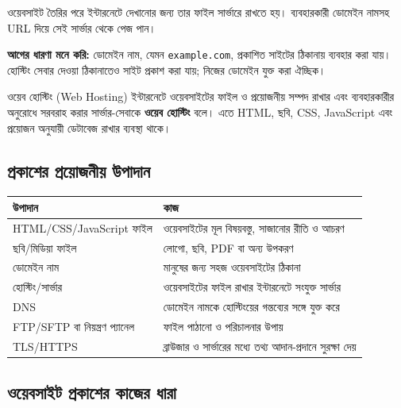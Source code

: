 ওয়েবসাইট তৈরির পরে ইন্টারনেটে দেখানোর জন্য তার ফাইল সার্ভারে রাখতে হয়। ব্যবহারকারী ডোমেইন নামসহ URL দিয়ে সেই সার্ভার থেকে পেজ পান।

\textbf{আগের ধারণা মনে করি:} ডোমেইন নাম, যেমন \texttt{example.com}, প্রকাশিত সাইটের ঠিকানায় ব্যবহার করা যায়। হোস্টিং সেবার দেওয়া ঠিকানাতেও সাইট প্রকাশ করা যায়; নিজের ডোমেইন যুক্ত করা ঐচ্ছিক।

\begin{definitionbox}{ওয়েব হোস্টিং (Web Hosting)}
ইন্টারনেটে ওয়েবসাইটের ফাইল ও প্রয়োজনীয় সম্পদ রাখার এবং ব্যবহারকারীর অনুরোধে সরবরাহ করার সার্ভার-সেবাকে \textbf{ওয়েব হোস্টিং} বলে। এতে HTML, ছবি, CSS, JavaScript এবং প্রয়োজন অনুযায়ী ডেটাবেজ রাখার ব্যবস্থা থাকে।
\end{definitionbox}

\subsection{প্রকাশের প্রয়োজনীয় উপাদান}

\begin{center}
\begin{tabular}{|p{}|p{}|}
\hline
\textbf{উপাদান} & \textbf{কাজ} \\
\hline
HTML/CSS/JavaScript ফাইল & ওয়েবসাইটের মূল বিষয়বস্তু, সাজানোর রীতি ও আচরণ \\
\hline
ছবি/মিডিয়া ফাইল & লোগো, ছবি, PDF বা অন্য উপকরণ \\
\hline
ডোমেইন নাম & মানুষের জন্য সহজ ওয়েবসাইটের ঠিকানা \\
\hline
হোস্টিং/সার্ভার & ওয়েবসাইটের ফাইল রাখার ইন্টারনেটে সংযুক্ত সার্ভার \\
\hline
DNS & ডোমেইন নামকে হোস্টিংয়ের গন্তব্যের সঙ্গে যুক্ত করে \\
\hline
FTP/SFTP বা নিয়ন্ত্রণ প্যানেল & ফাইল পাঠানো ও পরিচালনার উপায় \\
\hline
TLS/HTTPS & ব্রাউজার ও সার্ভারের মধ্যে তথ্য আদান-প্রদানে সুরক্ষা দেয় \\
\hline
\end{tabular}
\end{center}

\subsection{ওয়েবসাইট প্রকাশের কাজের ধারা}

\begin{center}
\end{center}

